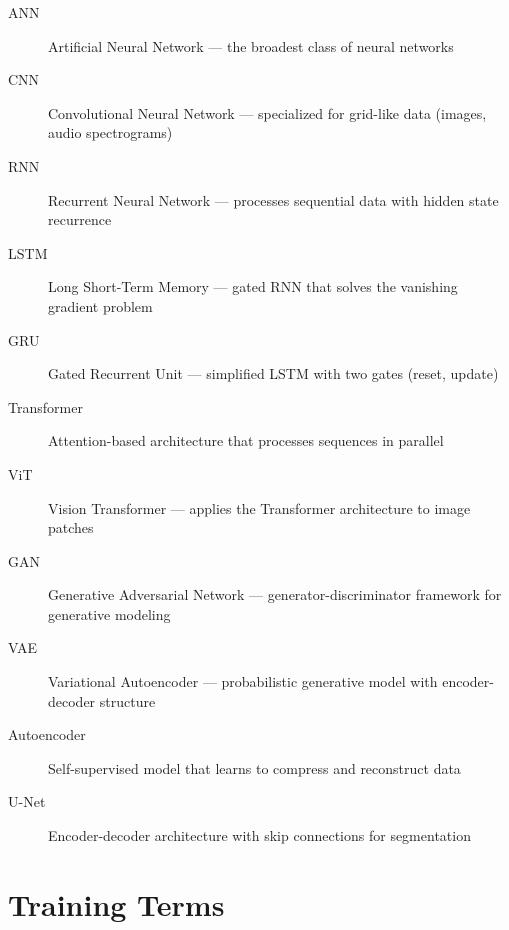 \begin{description}
    \item[ANN] Artificial Neural Network --- the broadest class of neural networks
    \item[CNN] Convolutional Neural Network --- specialized for grid-like data (images, audio spectrograms)
    \item[RNN] Recurrent Neural Network --- processes sequential data with hidden state recurrence
    \item[LSTM] Long Short-Term Memory --- gated RNN that solves the vanishing gradient problem
    \item[GRU] Gated Recurrent Unit --- simplified LSTM with two gates (reset, update)
    \item[Transformer] Attention-based architecture that processes sequences in parallel
    \item[ViT] Vision Transformer --- applies the Transformer architecture to image patches
    \item[GAN] Generative Adversarial Network --- generator-discriminator framework for generative modeling
    \item[VAE] Variational Autoencoder --- probabilistic generative model with encoder-decoder structure
    \item[Autoencoder] Self-supervised model that learns to compress and reconstruct data
    \item[U-Net] Encoder-decoder architecture with skip connections for segmentation
\end{description}

\section{Training Terms}

